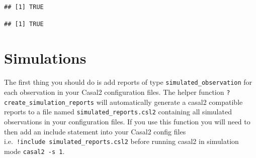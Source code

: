 \documentclass[
]{book}
\newenvironment{Shaded}{\begin{snugshade}}{\end{snugshade}}
\newcommand{\CommentTok}[1]{\textcolor[rgb]{0.56,0.35,0.01}{\textit{#1}}}
\newcommand{\FunctionTok}[1]{\textcolor[rgb]{0.00,0.00,0.00}{#1}}
\newcommand{\NormalTok}[1]{#1}
\newcommand{\SpecialCharTok}[1]{\textcolor[rgb]{0.00,0.00,0.00}{#1}}
\begin{document}
\begin{Shaded}
\end{Shaded}

\begin{verbatim}
## [1] TRUE
\end{verbatim}

\begin{Shaded}
\end{Shaded}

\begin{verbatim}
## [1] TRUE
\end{verbatim}

\hypertarget{simulations}{%
\section{Simulations}\label{simulations}}

The first thing you should do is add reports of type \texttt{simulated\_observation} for each observation in your Casal2 configuration files. The helper function \texttt{?create\_simulation\_reports} will automatically generate a casal2 compatible reports to a file named \texttt{simulated\_reports.csl2} containing all simulated observations in your configuration files. If you use this function you will need to then add an include statement into your Casal2 config files i.e.~\texttt{!include\ simulated\_reports.csl2} before running casal2 in simulation mode \texttt{casal2\ -s\ 1}.
\end{document}
